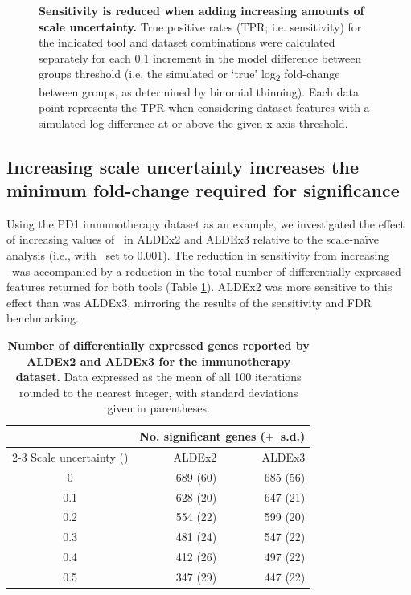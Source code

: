 \documentclass[10pt,letterpaper]{article}
\begin{document}
\begin{figure}[H]
    \centering
    \caption{\textbf{Sensitivity is reduced when adding increasing amounts of scale uncertainty.} True positive rates (TPR; i.e. sensitivity) for the indicated tool and dataset combinations were calculated separately for each 0.1 increment in the model difference between groups threshold (i.e. the simulated or `true' log\textsubscript{2} fold-change between groups, as determined by binomial thinning). Each data point represents the TPR when considering dataset features with a simulated log-difference at or above the given x-axis threshold.}
    \label{fig:TPR}
\end{figure}


\subsection*{Increasing scale uncertainty increases the minimum fold-change required for significance}
Using the PD1 immunotherapy dataset as an example, we investigated the effect of increasing values of \textgamma~in ALDEx2 and ALDEx3 relative to the scale-na\"ive analysis (i.e., with \textgamma~set to 0.001). The reduction in sensitivity from increasing \textgamma~was accompanied by a reduction in the total number of differentially expressed features returned for both tools (Table \ref{tab:sigGenes}). ALDEx2 was more sensitive to this effect than was ALDEx3, mirroring the results of the sensitivity and FDR benchmarking. 

\begin{table}[H]
    \caption{\textbf{Number of differentially expressed genes reported by ALDEx2 and ALDEx3 for the immunotherapy dataset.} Data expressed as the mean of all 100 iterations rounded to the nearest integer, with standard deviations given in parentheses.}
    \centering
    \begin{tabular}{crr}
        \toprule
        & \multicolumn{2}{c}{No. significant genes ($\pm$~s.d.)}\\
        \cmidrule(lr){2-3}
        Scale uncertainty (\textgamma{}) & ALDEx2 & ALDEx3\\
        \midrule
        0 & 689 (60) & 685 (56)\\
        0.1 & 628 (20) & 647 (21) \\
        0.2 & 554 (22) & 599 (20) \\
        0.3 & 481 (24) & 547 (22) \\
        0.4 & 412 (26) & 497 (22) \\
        0.5 & 347 (29) & 447 (22) \\
        \bottomrule
    \end{tabular}
    \label{tab:sigGenes}
\end{table}
\end{document}

